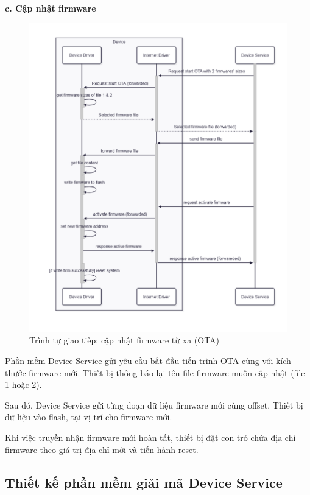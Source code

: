 \textbf{c. Cập nhật firmware}

\begin{figure}[!ht]
     \centering
    \includegraphics[width=1.0\linewidth]{Figures/Chap3_Device-firm-implementation-ota.png}
    \caption{Trình tự giao tiếp: cập nhật firmware từ xa (OTA)}
    \label{fig:hinh3.11}
\end{figure}

Phần mềm Device Service gửi yêu cầu bắt đầu tiến trình OTA cùng với kích thước firmware mới. Thiết bị thông báo lại tên file firmware muốn cập nhật (file 1 hoặc 2). 

Sau đó, Device Service gửi từng đoạn dữ liệu firmware mới cùng offset. Thiết bị dữ liệu vào flash, tại vị trí cho firmware mới.

Khi việc truyền nhận firmware mới hoàn tất, thiết bị đặt con trỏ chứa địa chỉ firmware theo giá trị địa chỉ mới và tiến hành reset.

\subsection{Thiết kế phần mềm giải mã Device Service}

